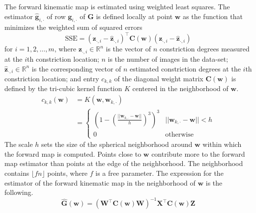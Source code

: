 \documentclass[preprint]{JASAnew}\usepackage[]{graphicx}\usepackage[]{color}
\begin{document}
%
The forward kinematic map is estimated using weighted least squares. 
% 
The estimator $\mathbf{\hat{g}}_{i,\cdot}$ of row $\mathbf{g}_{i,\cdot}$ of $\mathbf{G}$ is defined locally at point $\mathbf{w}$ as the function that minimizes the weighted sum of squared errors
%
\begin{equation}
\mathrm{SSE} 
=
\left( \mathbf{z}_{\cdot,i} - \mathbf{\hat{z}}_{\cdot,i} \right)^\intercal
\mathbf{C}(\mathbf{w})
\left( \mathbf{z}_{\cdot,i} - \mathbf{\hat{z}}_{\cdot,i} \right)
\end{equation}
%
for $i=1,2,\ldots,m$,
% 
where $\mathbf{z}_{\cdot,i} \in \mathbb{R}^{n}$ is the vector of $n$ constriction degrees measured at the $i$th constriction location; 
%
$n$ is the number of images in the data-set; 
%
$\mathbf{\hat{z}}_{\cdot,i} \in \mathbb{R}^{n}$ is the corresponding vector of $n$ estimated constriction degrees at the $i$th constriction location; and 
%
entry $c_{k,k}$ of the diagonal weight matrix $\mathbf{C}(\mathbf{w})$ is defined by the tri-cubic kernel function $K$ centered in the neighborhood of $\mathbf{w}$.
%
\begin{align}\label{eq:gaussiankernel}
c_{k,k} (\mathbf{w})
&=
K(\mathbf{w},\mathbf{w}_{k,\cdot}) \\
&= 
\begin{cases}
\left( 1 - \left( \frac{\lvert\lvert \mathbf{w}_{k,\cdot} - \mathbf{w} \rvert\rvert}{h} \right)^3 \right)^3 & \lvert\lvert \mathbf{w}_{k,\cdot} - \mathbf{w} \rvert\rvert < h \\
0 & \text{otherwise}
\end{cases} 
\end{align}
%
The scale $h$ sets the size of the spherical neighborhood around $\mathbf{w}$ within which the forward map is computed. 
%
Points close to $\mathbf{w}$ contribute more to the forward map estimator than points at the edge of the neighborhood.
%
The neighborhood contains $\lfloor fn \rfloor$ points, where $f$ is a free parameter. 
%
The expression for the estimator of the forward kinematic map in the neighborhood of $\mathbf{w}$ is the following. 
\begin{equation}
\mathbf{\hat{G}} (\mathbf{w})
=
\left( \mathbf{W}^\intercal \mathbf{C}(\mathbf{w}) \mathbf{W} \right)^{-1} \mathbf{X}^\intercal \mathbf{C}(\mathbf{w}) \mathbf{Z}
\end{equation}
\end{document}
